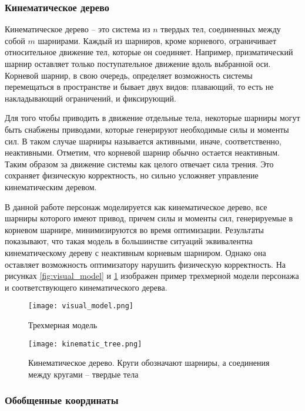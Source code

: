 \subsubsection{Кинематическое дерево}

Кинематическое дерево -- это система из $n$ твердых тел, соединенных между собой $m$ шарнирами. Каждый из шарниров, кроме корневого, ограничивает относительное движение тел, которые он соединяет. Например, призматический шарнир оставляет только поступательное движение вдоль выбранной оси. Корневой шарнир, в свою очередь, определяет возможность системы перемещаться в пространстве и бывает двух видов: плавающий, то есть не накладывающий ограничений, и фиксирующий.

Для того чтобы приводить в движение отдельные тела, некоторые шарниры могут быть снабжены приводами, которые генерируют необходимые силы и моменты сил. В таком случае шарниры называется активными, иначе, соответственно, неактивными. Отметим, что корневой шарнир обычно остается неактивным. Таким образом за движение системы как целого отвечает сила трения. Это сохраняет физическую корректность, но сильно усложняет управление кинематическим деревом.

В данной работе персонаж моделируется как кинематическое дерево, все шарниры которого имеют привод, причем силы и моменты сил, генерируемые в корневом шарнире, минимизируются во время оптимизации. Результаты показывают, что такая модель в большинстве ситуаций эквивалентна кинематическому дереву с неактивным корневым шарниром. Однако она оставляет возможность оптимизатору нарушить физическую корректность. На рисунках \ref{fig:visual_model} и \ref{fig:kinematic_tree} изображен пример трехмерной модели персонажа и соответствующего кинематического дерева.

\begin{figure}
  \begin{minipage}[t]{0.475\textwidth}
    \centering
    \texttt{[image: visual\_model.png]}
    \caption{Трехмерная модель}
    \label{fig:visual_model}
  \end{minipage}
\hfill
  \begin{minipage}[t]{0.475\textwidth}
    \centering
    \texttt{[image: kinematic\_tree.png]}
    \caption{Кинематическое дерево. Круги обозначают шарниры, а соединения между кругами -- твердые тела}
    \label{fig:kinematic_tree}
  \end{minipage}
\end{figure}

\subsubsection{Обобщенные координаты}

